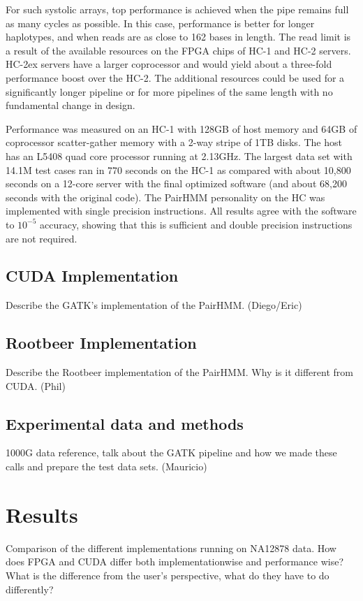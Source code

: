 \documentclass[11pt, oneside]{article}
\begin{document}
	For such systolic arrays, top performance is achieved when the pipe remains full as many cycles as possible.  In this case, performance is better for longer haplotypes, and when reads are as close to 162 bases in length.  The read limit is a result of the available resources on the FPGA chips of HC-1 and HC-2 servers.  HC-2ex servers have a larger coprocessor and would yield about a three-fold performance boost over the HC-2.  The additional resources could be used for a significantly longer pipeline or for more pipelines of the same length with no fundamental change in design.

	Performance was measured on an HC-1 with 128GB of host memory and 64GB of coprocessor scatter-gather memory with a 2-way stripe of 1TB disks.  The host has an L5408 quad core processor running at 2.13GHz.  The largest data set with 14.1M test cases ran in 770 seconds on the HC-1 as compared with about 10,800 seconds on a 12-core server with the final optimized software (and about 68,200 seconds with the original code).  The PairHMM personality on the HC was implemented with single precision instructions.  All results agree with the software to $10^{-5}$ accuracy, showing that this is sufficient and double precision instructions are not required.

	\subsection{CUDA Implementation}
	Describe the GATK's implementation of the PairHMM. (Diego/Eric)
	
	\subsection{Rootbeer Implementation}
	Describe the Rootbeer implementation of the PairHMM. Why is it different from CUDA. (Phil)

	\subsection{Experimental data and methods}
	1000G data reference, talk about the GATK pipeline and how we made these calls and prepare the test data sets. (Mauricio)

	\section{Results}
	Comparison of the different implementations running on NA12878 data.
	How does FPGA and CUDA differ both implementationwise and performance wise? 
	What is the difference from the user's perspective, what do they have to do differently?
\end{document}
